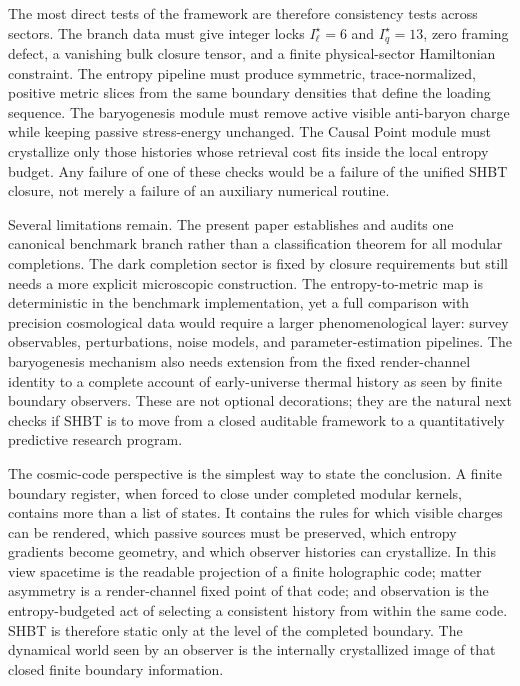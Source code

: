 \documentclass[11pt]{article}
\begin{document}
The most direct tests of the framework are therefore consistency tests across
sectors.  The branch data must give integer locks
$I_{\ell}^{\star}=6$ and $I_q^{\star}=13$, zero framing defect, a vanishing
bulk closure tensor, and a finite physical-sector Hamiltonian constraint.  The
entropy pipeline must produce symmetric, trace-normalized, positive metric
slices from the same boundary densities that define the loading sequence.  The
baryogenesis module must remove active visible anti-baryon charge while keeping
passive stress-energy unchanged.  The Causal Point module must crystallize only
those histories whose retrieval cost fits inside the local entropy budget.  Any
failure of one of these checks would be a failure of the unified SHBT closure,
not merely a failure of an auxiliary numerical routine.

Several limitations remain.  The present paper establishes and audits one
canonical benchmark branch rather than a classification theorem for all modular
completions.  The dark completion sector is fixed by closure requirements but
still needs a more explicit microscopic construction.  The entropy-to-metric
map is deterministic in the benchmark implementation, yet a full comparison
with precision cosmological data would require a larger phenomenological layer:
survey observables, perturbations, noise models, and parameter-estimation
pipelines.  The baryogenesis mechanism also needs extension from the fixed
render-channel identity to a complete account of early-universe thermal history
as seen by finite boundary observers.  These are not optional decorations; they
are the natural next checks if SHBT is to move from a closed auditable framework
to a quantitatively predictive research program.

The cosmic-code perspective is the simplest way to state the conclusion.  A
finite boundary register, when forced to close under completed modular kernels,
contains more than a list of states.  It contains the rules for which visible
charges can be rendered, which passive sources must be preserved, which entropy
gradients become geometry, and which observer histories can crystallize.  In
this view spacetime is the readable projection of a finite holographic code;
matter asymmetry is a render-channel fixed point of that code; and observation
is the entropy-budgeted act of selecting a consistent history from within the
same code.  SHBT is therefore static only at the level of the completed
boundary.  The dynamical world seen by an observer is the internally
crystallized image of that closed finite boundary information.
\end{document}
